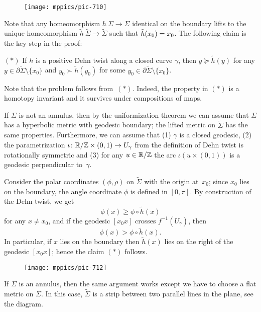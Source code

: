{

\begin{wrapfigure}{o}{27 mm}
\vskip-0mm
\centering
\texttt{[image: mppics/pic-710]}
\end{wrapfigure}

Note that any homeomorphism $h\:\Sigma\to\Sigma$ identical on the boundary
lifts to the unique homeomorphism $\tilde h\:\tilde \Sigma\to\tilde\Sigma$ 
such that $\tilde h(x_0)\z=x_0$.
The following claim is the key step in the proof:

}

\begin{cl}{$({*})$} 
If $h$ is a positive Dehn twist along a closed curve $\gamma$,
then $y\succeq \tilde h(y)$ for any $y\in\partial\tilde\Sigma\setminus\{x_0\}$
and $y_0\succ\tilde h(y_0)$ for some $y_0\in\partial\tilde\Sigma\setminus\{x_0\}$.
\end{cl}

Note that the problem follows from~$({*})$.
Indeed, the property in $({*})$ is a homotopy invariant 
and it survives under compositions of maps.

\medskip

If $\Sigma$ is not an annulus,
then by the uniformization theorem we can assume that $\Sigma$ has a  hyperbolic metric with geodesic boundary; 
the lifted metric on $\tilde\Sigma$ has the same properties.
Furthermore, we can assume that (1) $\gamma$ is a closed geodesic,
(2) the parametrization $\iota\:\RR/\ZZ\z\times (0,1)\to U_\gamma$ from the definition of Dehn twist is rotationally symmetric 
and (3) for any $u\in \mathbb{R}/\mathbb{Z}$ the arc $\iota(u\times (0,1))$ is a geodesic perpendicular to~$\gamma$. 

Consider the polar coordinates $(\phi,\rho)$ on $\tilde\Sigma$ with the origin at~$x_0$;
since $x_0$ lies on the boundary, the angle coordinate $\phi$ is defined in $[0,\pi]$. 
By construction of the Dehn twist, we get 
\[\phi(x)\ge \phi\circ\tilde h(x)\]
for any $x\ne x_0$,
and if the geodesic $[x_0x]$ crosses $f^{-1}(U_\gamma)$, then 
\[\phi(x)> \phi\circ\tilde h(x).\]
In particular, if $x$ lies on the boundary then $\tilde h(x)$ lies on the right of the geodesic $[x_0x]$; hence the claim $({*})$ follows. 

\begin{figure}[!ht]
\vskip0mm
\centering
\texttt{[image: mppics/pic-712]}
\end{figure}

If $\Sigma$ is an annulus, then the same argument works except we have to choose a flat metric on $\Sigma$.
In this case, $\tilde \Sigma$ is a strip between two parallel lines in the plane, see the diagram.
\qeds

